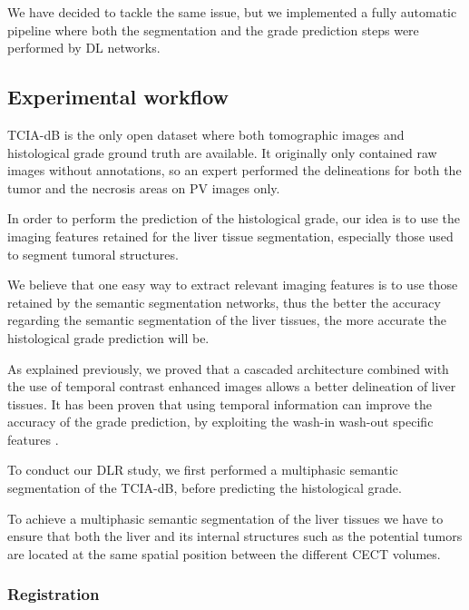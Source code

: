 \documentclass[]{article}
\newcommand{\lmttfont}[1]{{\fontfamily{lmtt}\selectfont #1}}
\begin{document}
We have decided to tackle the same issue, but we implemented a fully
automatic pipeline where both the segmentation and the grade prediction
steps were performed by DL networks.

\subsection{Experimental workflow}\label{experimental-workflow}

\lmttfont{TCIA-dB} is the only open dataset where both tomographic images and
histological grade ground truth are available. It originally only
contained raw images without annotations, so an expert performed the
delineations for both the tumor and the necrosis areas on PV images only.

In order to perform the prediction of the histological grade, our idea
is to use the imaging features retained for the liver tissue
segmentation, especially those used to segment tumoral structures.

We believe that one easy way to extract relevant imaging features is to
use those retained by the semantic segmentation networks, thus the
better the accuracy regarding the semantic segmentation of the liver
tissues, the more accurate the histological grade prediction will be.

As explained previously, we proved that a cascaded architecture combined
with the use of temporal contrast enhanced images allows a better
delineation of liver tissues. It has been proven that using temporal information can improve the accuracy of the grade prediction, by exploiting the wash-in
wash-out specific features \cite{Okamoto2012}.

To conduct our DLR study, we first performed a multiphasic
semantic segmentation of the \lmttfont{TCIA-dB}, before predicting the
histological grade.

To achieve a multiphasic semantic segmentation of the liver tissues we
have to ensure that both the liver and its internal structures such as
the potential tumors are located at the same spatial position between
the different CECT volumes.


\subsubsection{Registration}\label{registration}
\end{document}
